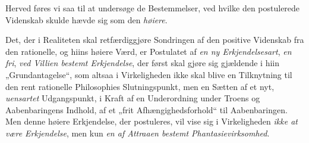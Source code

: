 \documentclass[12pt,a4paper]{book}
\newcommand{\opage}[1]{\marginnote{\footnotesize\textit{[#1]}}}
\begin{document}
Herved føres vi saa til at undersøge de Bestemmelser, ved hvilke den postulerede Videnskab
skulde hævde sig som den \emph{høiere}.

Det, der i Realiteten skal retfærdiggjøre Sondringen af den positive Videnskab fra den
rationelle, og hiins høiere Værd, er Postulatet af \emph{en ny Erkjendelsesart}, \emph{en fri}, \opage{106}\emph{ved Villien bestemt Erkjendelse}, der først skal gjøre sig gjældende i hiin „Grundantagelse“,
som altsaa i Virkeligheden ikke skal blive en Tilknytning til den rent rationelle
Philosophies Slutningspunkt, men en Sætten af et nyt, \emph{uensartet} Udgangspunkt, i Kraft af
en Underordning under Troens og Aabenbaringens Indhold, af et „frit Afhængighedsforhold“
til Aabenbaringen. Men denne høiere Erkjendelse, der postuleres, vil vise sig i Virkeligheden \emph{ikke at være Erkjendelse}, men kun \emph{en af Attraaen bestemt
Phantasievirksomhed}.
\end{document}
